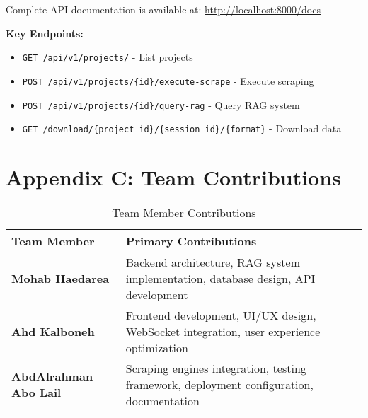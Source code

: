 \documentclass[12pt,a4paper]{report}
\begin{document}
Complete API documentation is available at: \url{http://localhost:8000/docs}

\textbf{Key Endpoints:}
\begin{itemize}
    \item \texttt{GET /api/v1/projects/} - List projects
    \item \texttt{POST /api/v1/projects/\{id\}/execute-scrape} - Execute scraping
    \item \texttt{POST /api/v1/projects/\{id\}/query-rag} - Query RAG system
    \item \texttt{GET /download/\{project\_id\}/\{session\_id\}/\{format\}} - Download data
\end{itemize}

\section*{Appendix C: Team Contributions}

\begin{table}[H]
    \centering
    \caption{Team Member Contributions}
    \begin{tabular}{|l|p{8cm}|}
        \hline
        \textbf{Team Member} & \textbf{Primary Contributions} \\
        \hline
        \textbf{Mohab Haedarea} & Backend architecture, RAG system implementation, database design, API development \\
        \hline
        \textbf{Ahd Kalboneh} & Frontend development, UI/UX design, WebSocket integration, user experience optimization \\
        \hline
        \textbf{AbdAlrahman Abo Lail} & Scraping engines integration, testing framework, deployment configuration, documentation \\
        \hline
    \end{tabular}
\end{table}
\end{document}
